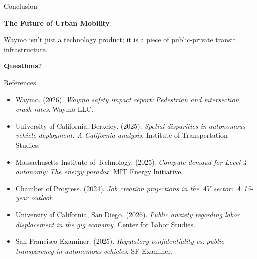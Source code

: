 \documentclass[aspectratio=169]{beamer}
\begin{document}
\begin{frame}{Conclusion}
\begin{center}
\Huge{\textbf{The Future of Urban Mobility}}
\vspace{1cm}

\Large{Waymo isn't just a technology product; it is a piece of public-private transit infrastructure.}
\vspace{1.5cm}

\textbf{Questions?}
\end{center}
\end{frame}

\begin{frame}{References}
\small
\begin{itemize}
    \item Waymo. (2026). \textit{Waymo safety impact report: Pedestrian and intersection crash rates}. Waymo LLC.
    \item University of California, Berkeley. (2025). \textit{Spatial disparities in autonomous vehicle deployment: A California analysis}. Institute of Transportation Studies.
    \item Massachusetts Institute of Technology. (2025). \textit{Compute demand for Level 4 autonomy: The energy paradox}. MIT Energy Initiative.
    \item Chamber of Progress. (2024). \textit{Job creation projections in the AV sector: A 15-year outlook}.
    \item University of California, San Diego. (2026). \textit{Public anxiety regarding labor displacement in the gig economy}. Center for Labor Studies.
    \item San Francisco Examiner. (2025). \textit{Regulatory confidentiality vs. public transparency in autonomous vehicles}. SF Examiner.
\end{itemize}
\end{frame}
\end{document}
